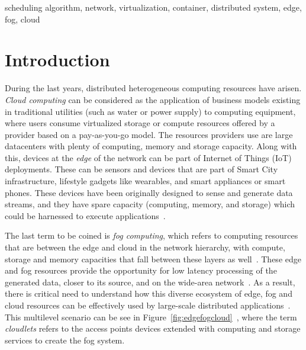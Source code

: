 \documentclass[conference]{IEEEtran}
\begin{document}
\begin{IEEEkeywords}
scheduling algorithm, network, virtualization, container, distributed system, edge, fog, cloud 
\end{IEEEkeywords}



\section{Introduction}

During the last years, distributed heterogeneous computing resources have arisen. \emph{Cloud computing} can be considered as the application of business models existing in traditional utilities (such as water or power supply) to computing equipment, where users consume virtualized storage or compute resources offered by a provider based on a pay-as-you-go model. The resources providers use are large datacenters with plenty of computing, memory and storage capacity. Along with this, devices at the \emph{edge} of the network can be  part of Internet of Things (IoT) deployments.  These can be sensors and devices that are part of Smart City infrastructure, lifestyle gadgets like wearables, and smart appliances or smart phones. These devices have been originally designed to sense and generate data streams, and they have spare capacity (computing, memory, and storage) which could be harnessed to execute applications~\cite{GhoshKS18}. 

The last term to be coined is \emph{fog computing}, which refers to computing resources that are between the edge and cloud in the network hierarchy, with compute, storage and memory capacities that fall between these layers as well~\cite{Simmhan19}. These edge and fog resources provide the opportunity for low latency processing of the generated data, closer to its source, and on the wide-area network~\cite{Stojmenovic2014}. As a result, there is critical need to understand how this diverse ecosystem of edge, fog and cloud resources can be effectively used by large-scale distributed applications~\cite{Varshney2019}. This multilevel scenario can be see in Figure~\ref{fig:edgefogcloud}~\cite{BittencourtMBRP17}, where the term \emph{cloudlets}  refers to the access points devices extended with computing and storage services to create the fog system.
 
\end{document}
